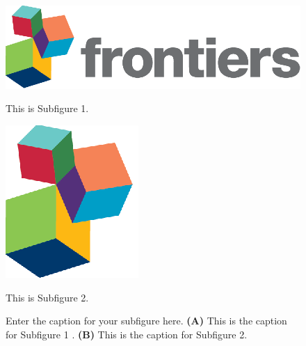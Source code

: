 \documentclass[utf8]{frontiers_suppmat} %
\begin{document}
    \setcounter{figure}{2}
    \setcounter{subfigure}{0}
    \begin{subfigure}
        \setcounter{figure}{2}
        \setcounter{subfigure}{0}
        \centering
        \begin{minipage}[b]{0.5\textwidth}
            \includegraphics[width=\linewidth]{logo1.eps}
            \caption{This is Subfigure 1.}
            \label{fig:Subfigure 1}
        \end{minipage}

        \setcounter{figure}{2}
        \setcounter{subfigure}{1}
        \begin{minipage}[b]{0.5\textwidth}
            \includegraphics[width=\linewidth]{logo2.eps}
            \caption{This is Subfigure 2.}
            \label{fig:Subfigure 2}
        \end{minipage}

        \setcounter{figure}{2}
        \setcounter{subfigure}{-1}
        \caption{Enter the caption for your subfigure here. \textbf{(A)} This is the caption for Subfigure 1
        . \textbf{(B)} This is the caption for Subfigure 2.}
        \label{fig: subfigures}
    \end{subfigure}
\end{document}
